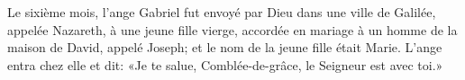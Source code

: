 Le sixième mois,
	l’ange Gabriel fut envoyé par Dieu dans une ville de Galilée, appelée Nazareth,
	à une jeune fille vierge,
	accordée en mariage à un homme de la maison de David, appelé Joseph;
	et le nom de la jeune fille était Marie.
L’ange entra chez elle et dit:
	«Je te salue, Comblée-de-grâce, le Seigneur est avec toi.»
